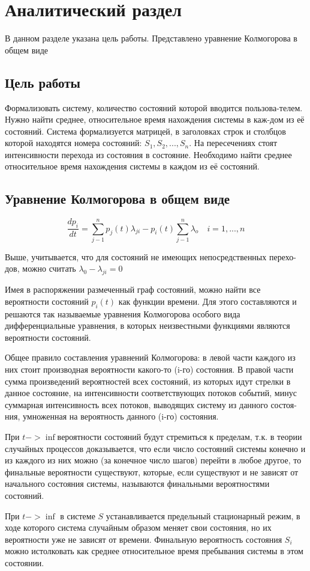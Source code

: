 \newpage
\section{Аналитический раздел}
В данном разделе указана цель работы. Представлено уравнение Колмогорова в общем виде

\subsection{Цель работы}
Формализовать систему, количество состояний которой вводится пользова-телем. Нужно найти среднее, относительное время нахождения системы в каж-дом из её состояний. Система формализуется матрицей, в заголовках строк и столбцов которой находятся номера состояний: $S_1, S_2, ..., S_n$. 
На пересечениях стоят интенсивности перехода из состояния в состояние. 
Необходимо найти среднее относительное время нахождения системы в каждом из её состояний.

\subsection{Уравнение Колмогорова в общем виде}
\begin{equation}
\frac{dp_i}{dt} = \sum_{j - 1}^{n}p_j(t)\lambda_{ji} - p_i(t)\sum_{j - 1}^{n} \lambda_o \quad i=1,...,n
\end{equation}

Выше, учитывается, что для состояний не имеющих непосредственных перехо-дов, можно считать $\lambda_0 - \lambda_{ji} = 0$

Имея в распоряжении размеченный граф состояний, можно найти все вероятности состояний $p_i(t)$ как функции времени. 
Для этого составляются и решаются так называемые уравнения Колмогорова особого вида дифференциальные уравнения, в которых неизвестными функциями являются вероятности состояний.

Общее правило составления уравнений Колмогорова: в левой части каждого из них стоит производная вероятности какого-то (i-го) состояния. 
В правой части сумма произведений вероятностей всех состояний, из которых идут стрелки в данное состояние, на интенсивности соответствующих потоков событий, минус суммарная интенсивность всех потоков, выводящих систему из данного состоя-ния, умноженная на вероятность данного (i-го) состояния.

При $t->\inf$вероятности состояний будут стремиться к пределам, т.к. в теории случайных процессов доказывается, что если число состояний системы конечно и из каждого из них можно (за конечное число шагов) перейти в любое другое, то финальные вероятности существуют, которые, если существуют и не зависят от начального состояния системы, называются финальными вероятностями состояний.

При $t->\inf$ в системе $S$ устанавливается предельный стационарный режим, в ходе которого система случайным образом меняет свои состояния, но их вероятности уже не зависят от времени. Финальную вероятность состояния $S_i$ можно истолковать как среднее относительное время пребывания системы в этом состоянии.